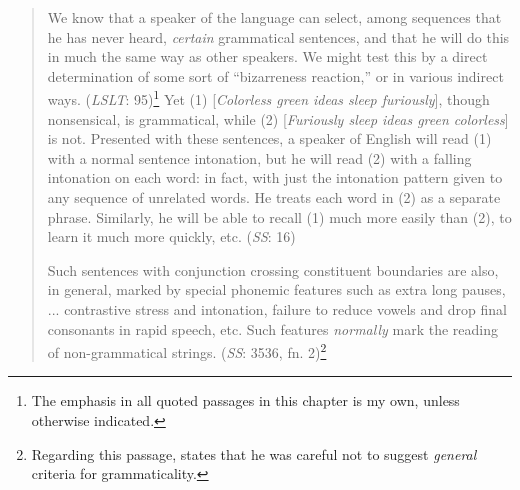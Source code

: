 \begin{quote}
We know that a speaker of the language can select, among sequences that he has never heard,  \textit{certain} grammatical sentences, and that he will do this in much the same way as other speakers. We might test this by a direct determination of some sort of ``bizarreness reaction,'' or in various indirect ways. (\textit{LSLT}: 95)\footnote{The emphasis in all quoted passages in this chapter is my own, unless otherwise indicated.}
Yet (1) [\textit{Colorless green ideas sleep furiously}], though nonsensical, is grammatical, while (2) [\textit{Furiously sleep ideas green colorless}] is not.  Presented with these sentences, a speaker of English will read (1) with a normal sentence intonation, but he will read (2)  with a falling intonation on each word: in fact, with just the intonation pattern given to any sequence of unrelated words. He treats each word in (2)  as a separate phrase. Similarly, he will be able to recall (1) much more easily than (2), to learn it much more quickly, etc. (\textit{SS}: 16)

Such sentences with conjunction crossing constituent boundaries are also, in general, marked by special phonemic features such as extra long pauses, ... contrastive stress and intonation, failure to reduce vowels and drop final consonants in rapid speech, etc. Such features \textit{normally} mark the reading of non-grammatical strings. (\textit{SS}: 35\textendash{}36, fn. 2)\footnote{Regarding this passage, \citet{Chomsky1961} states that he was careful not to suggest \textit{general} criteria for grammaticality.}

 \end{quote}

